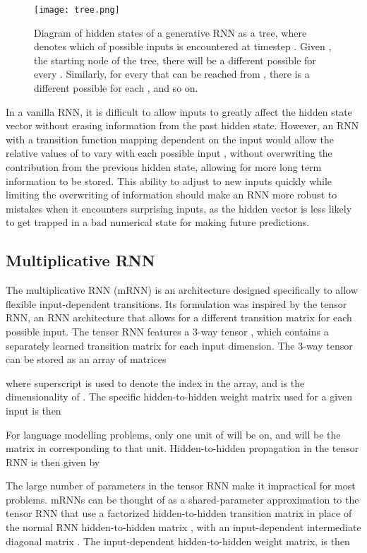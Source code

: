 \documentclass{article}
\begin{document}
\begin{figure}[tb]
\texttt{[image: tree.png]}
\caption{Diagram of hidden states of a generative RNN as a tree, where  denotes which of  possible inputs is encountered at timestep . Given , the starting node of the tree, there will be a different possible  for every .  Similarly, for every  that can be reached from  , there is a different possible  for each , and so on.}
\label{fig:tree}
\end{figure}

In a vanilla RNN, it is difficult to allow inputs to greatly affect the hidden state vector without erasing information from the past hidden state. However,  an RNN with a transition function mapping  dependent on the input would allow the relative values of  to vary with each possible input , without overwriting the contribution from the previous hidden state, allowing for more long term information to be stored. This ability to adjust to new inputs quickly while limiting the overwriting of information should make an RNN more robust to mistakes when it encounters surprising inputs, as the hidden vector is less likely to get trapped in a bad numerical state for making future predictions.  

\subsection{Multiplicative RNN}
The multiplicative RNN (mRNN) \citep{Sutskever-2011} is an architecture designed specifically to allow flexible input-dependent transitions. Its formulation was inspired by the tensor RNN, an RNN architecture that allows for a different transition matrix for each possible input. The tensor RNN features a 3-way tensor , which contains a separately learned transition matrix  for each input dimension. The 3-way tensor can be stored as an array of matrices 

where superscript is used to denote the index in the array, and  is the dimensionality of . The specific hidden-to-hidden weight matrix   used for a given input  is then

For language modelling problems, only one unit of  will be on, and   will be the matrix in  corresponding to that unit. Hidden-to-hidden propagation in the tensor RNN is then given by


The large number of parameters in the tensor RNN make it impractical for most problems. mRNNs can be thought of as a shared-parameter approximation to the tensor RNN that use a factorized hidden-to-hidden transition matrix in place of the normal RNN hidden-to-hidden matrix , with an input-dependent intermediate diagonal matrix . The input-dependent hidden-to-hidden weight matrix,  is then
\end{document}
